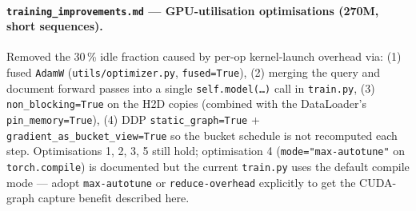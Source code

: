 \documentclass{article}
\begin{document}
\paragraph{\texttt{training\_improvements.md} --- GPU-utilisation
optimisations (270M, short sequences).} Removed the 30\,\% idle
fraction caused by per-op kernel-launch overhead via: (1) fused
\texttt{AdamW} (\texttt{utils/optimizer.py}, \texttt{fused=True}),
(2) merging the query and document forward passes into a single
\texttt{self.model(\dots)} call in \texttt{train.py}, (3)
\texttt{non\_blocking=True} on the H2D copies (combined with the
DataLoader's \texttt{pin\_memory=True}), (4) DDP
\texttt{static\_graph=True} +
\texttt{gradient\_as\_bucket\_view=True} so the bucket schedule is
not recomputed each step. Optimisations 1, 2, 3, 5 still hold;
optimisation 4 (\texttt{mode="max-autotune"} on
\texttt{torch.compile}) is documented but the current
\texttt{train.py} uses the default compile mode --- adopt
\texttt{max-autotune} or \texttt{reduce-overhead} explicitly to get
the CUDA-graph capture benefit described here.
\end{document}
